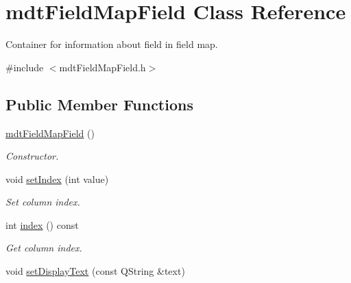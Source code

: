 \hypertarget{classmdt_field_map_field}{
\section{mdtFieldMapField Class Reference}
\label{classmdt_field_map_field}
}


Container for information about field in field map.  




{\ttfamily \#include $<$mdtFieldMapField.h$>$}

\subsection*{Public Member Functions}
\begin{DoxyCompactItemize}
\item 
\hypertarget{classmdt_field_map_field_af2ba29d63e03cea7c71f3f6367133b33}{
\hyperlink{classmdt_field_map_field_af2ba29d63e03cea7c71f3f6367133b33}{mdtFieldMapField} ()}
\label{classmdt_field_map_field_af2ba29d63e03cea7c71f3f6367133b33}

\begin{DoxyCompactList}\small\item\em Constructor. \end{DoxyCompactList}\item 
\hypertarget{classmdt_field_map_field_a7cb5833082c2b7d531b1f67db2dc0060}{
void \hyperlink{classmdt_field_map_field_a7cb5833082c2b7d531b1f67db2dc0060}{setIndex} (int value)}
\label{classmdt_field_map_field_a7cb5833082c2b7d531b1f67db2dc0060}

\begin{DoxyCompactList}\small\item\em Set column index. \end{DoxyCompactList}\item 
\hypertarget{classmdt_field_map_field_a73bef09966745b3192abfa93ed83b51b}{
int \hyperlink{classmdt_field_map_field_a73bef09966745b3192abfa93ed83b51b}{index} () const }
\label{classmdt_field_map_field_a73bef09966745b3192abfa93ed83b51b}

\begin{DoxyCompactList}\small\item\em Get column index. \end{DoxyCompactList}\item 
\hypertarget{classmdt_field_map_field_ae5aa003e043f4ebec34f5670e1640eb6}{
void \hyperlink{classmdt_field_map_field_ae5aa003e043f4ebec34f5670e1640eb6}{setDisplayText} (const QString \&text)}
\label{classmdt_field_map_field_ae5aa003e043f4ebec34f5670e1640eb6}


\end{DoxyCompactItemize}
